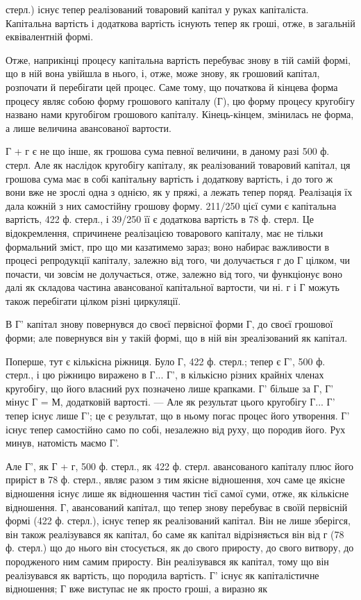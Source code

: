 \parcont{}  %
стерл.) існує тепер реалізований товаровий капітал у руках капіталіста.
Капітальна вартість і додаткова вартість існують тепер як гроші,
отже, в загальній еквівалентній формі.

Отже, наприкінці процесу капітальна вартість перебуває знову
в тій самій формі, що в ній вона увійшла в нього, і, отже, може знову,
як грошовий капітал, розпочати й перебігати цей процес. Саме тому, що
початкова й кінцева форма процесу являє собою форму грошового капіталу
(Г), цю форму процесу кругобігу названо нами кругобігом
грошового капіталу. Кінець-кінцем, змінилась не форма, а лише величина
авансованої вартости.

Г + г є не що інше, як грошова сума певної величини, в даному разі
500 ф. стерл. Але як наслідок кругобігу капіталу, як реалізований
товаровий капітал, ця грошова сума має в собі капітальну вартість
і додаткову вартість, і до того ж вони вже не зрослі одна з однією, як
у пряжі, а лежать тепер поряд. Реалізація їх дала кожній з них самостійну
грошову форму. 211/250 цієї суми є капітальна вартість, 422 ф.
стерл., і 39/250 її є додаткова вартість в 78 ф. стерл. Це відокремлення,
спричинене реалізацією товарового капіталу, має не тільки формальний
зміст, про що ми казатимемо зараз; воно набирає важливости в процесі
репродукції капіталу, залежно від того, чи долучається г до Г цілком, чи
почасти, чи зовсім не долучається, отже, залежно від того, чи функціонує
воно далі як складова частина авансованої капітальної вартости, чи ні.
г і Г можуть також перебігати цілком різні циркуляції.

В Г' капітал знову повернувся до своєї первісної форми Г, до своєї
грошової форми; але повернувся він у такій формі, що в ній він зреалізований
як капітал.

Поперше, тут є кількісна ріжниця. Було Г, 422 ф. стерл.; тепер є Г',
500 ф. стерл., і цю ріжницю виражено в Г... Г', в кількісно різних
крайніх членах кругобігу, що його власний рух позначено лише крапками.
Г' більше за Г, Г' мінус Г = М, додатковій вартості. — Але як результат цього
кругобігу Г... Г' тепер існує лише Г'; це є результат, що в ньому погас
процес його утворення. Г' існує тепер самостійно само по собі, незалежно
від руху, що породив його. Рух минув, натомість маємо Г'.

Але Г', як Г + г, 500 ф. стерл., як 422 ф. стерл. авансованого капіталу
плюс його приріст в 78 ф. стерл., являє разом з тим якісне відношення,
хоч саме це якісне відношення існує лише як відношення частин тієї
самої суми, отже, як кількісне відношення. Г, авансований капітал, що
тепер знову перебуває в своїй первісній формі (422 ф. стерл.), існує
тепер як реалізований капітал. Він не лише зберігся, він також реалізувався
як капітал, бо саме як капітал відрізняється він від г (78 ф. стерл.)
що до нього він стосується, як до свого приросту, до свого витвору, до
породженого ним самим приросту. Він реалізувався як капітал, тому що
він реалізувався як вартість, що породила вартість. Г' існує як капіталістичне
відношення; Г вже виступає не як просто гроші, а виразно як
\parbreak{}  %
